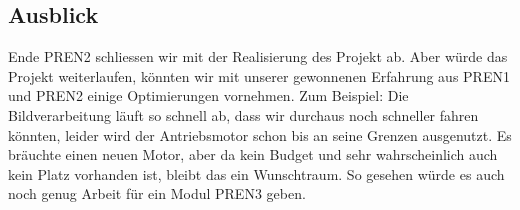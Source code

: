 \subsection{Ausblick}

Ende PREN2 schliessen wir mit der Realisierung des Projekt ab. Aber würde das Projekt weiterlaufen, könnten wir mit unserer gewonnenen Erfahrung aus PREN1 und PREN2 einige Optimierungen vornehmen.
%
Zum Beispiel: Die Bildverarbeitung läuft so schnell ab, dass wir durchaus noch schneller fahren könnten, leider wird der Antriebsmotor schon bis an seine Grenzen ausgenutzt. Es bräuchte einen neuen Motor, aber da kein Budget und sehr wahrscheinlich auch kein Platz vorhanden ist, bleibt das ein Wunschtraum.
So gesehen würde es auch noch genug Arbeit für ein Modul PREN3 geben.